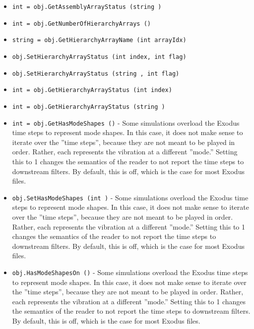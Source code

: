 \begin{itemize}
\item  \verb|int = obj.GetAssemblyArrayStatus (string )|

\item  \verb|int = obj.GetNumberOfHierarchyArrays ()|

\item  \verb|string = obj.GetHierarchyArrayName (int arrayIdx)|

\item  \verb|obj.SetHierarchyArrayStatus (int index, int flag)|

\item  \verb|obj.SetHierarchyArrayStatus (string , int flag)|

\item  \verb|int = obj.GetHierarchyArrayStatus (int index)|

\item  \verb|int = obj.GetHierarchyArrayStatus (string )|

\item  \verb|int = obj.GetHasModeShapes ()| -  Some simulations overload the Exodus time steps to represent mode shapes.
 In this case, it does not make sense to iterate over the ''time steps'',
 because they are not meant to be played in order.  Rather, each represents
 the vibration at a different ''mode.''  Setting this to 1 changes the
 semantics of the reader to not report the time steps to downstream filters.
 By default, this is off, which is the case for most Exodus files.

\item  \verb|obj.SetHasModeShapes (int )| -  Some simulations overload the Exodus time steps to represent mode shapes.
 In this case, it does not make sense to iterate over the ''time steps'',
 because they are not meant to be played in order.  Rather, each represents
 the vibration at a different ''mode.''  Setting this to 1 changes the
 semantics of the reader to not report the time steps to downstream filters.
 By default, this is off, which is the case for most Exodus files.

\item  \verb|obj.HasModeShapesOn ()| -  Some simulations overload the Exodus time steps to represent mode shapes.
 In this case, it does not make sense to iterate over the ''time steps'',
 because they are not meant to be played in order.  Rather, each represents
 the vibration at a different ''mode.''  Setting this to 1 changes the
 semantics of the reader to not report the time steps to downstream filters.
 By default, this is off, which is the case for most Exodus files.


\end{itemize}
